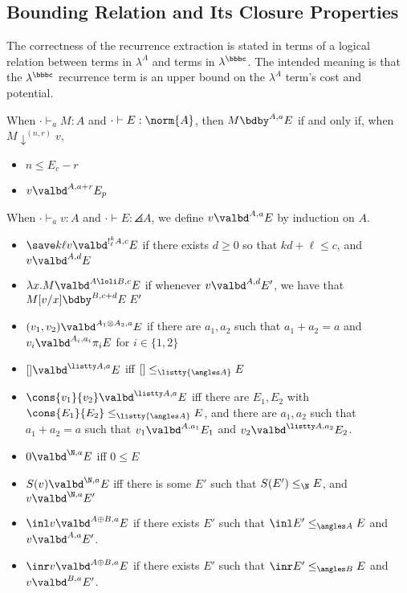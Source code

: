 \subsection{Bounding Relation and Its Closure Properties}

The correctness of the recurrence extraction is stated in terms of a
logical relation between terms in $\lambda^A$ and terms in
$\lambda^\bbbc$. The intended meaning is that the $\lambda^\bbbc$
recurrence term is an upper bound on the $\lambda^A$ term's cost and
potential.

\begin{definition} \label{def:bounding}
When $\cdot \vdash_a M : A$ and $\cdot \vdash E : \norm{A}$, then $M \bdby^{A,a} E$ if and only if, when $M \downarrow^{(n,r)} v$,
\begin{itemize}
  \item $n \leq E_c - r$
  \item $v \valbd^{A,a+r} E_p$
\end{itemize}
When $\cdot \vdash_a v : A$ and $\cdot \vdash E : \angles A$, we define $v
\valbd^{A,a} E$ by induction on $A$.
\begin{itemize}
    \item $\save k \ell v \valbd^{!^k_\ell A,c} E$ if there exists $d \geq 0$ so that $kd + \ell \leq c$, and $v \valbd^{A,d} E$
    \item $\lambda x.M \valbd^{A \loli B, c} E$ if whenever $v \valbd^{A,d} E'$, we have that $M[v/x] \bdby^{B,c+d} E \; E'$
    \item $(v_1,v_2) \valbd^{A_1 \otimes A_2,a} E$ if there are $a_1,a_2$ such that $a_1+a_2 = a$ and $v_i \valbd^{A_i,a_i} \pi_i E$ for $i \in \{1,2\}$
    \item $[] \valbd^{\listty A,a} E$ iff $[] \leq_{\listty {\angles A}} E$
    \item $\cons {v_1} {v_2} \valbd^{\listty A,a} E$ iff there are $E_1,E_2$ with $\cons {E_1} {E_2} \leq_{\listty {\angles A}} E$, and there are $a_1,a_2$ such that $a_1 + a_2 = a$ such that $v_1 \valbd^{A,a_1} E_1$ and $v_2 \valbd^{\listty A, a_2} E_2$.
    \item $0 \valbd^{\N,a} E$ iff $0 \leq E$
    \item $S(v) \valbd^{\N,a} E$ iff there is some $E'$ such that $S(E') \leq_\N E$, and $v \valbd^{\N,a} E'$
    \item $\inl v \valbd^{A \oplus B,a} E$ if there exists $E'$ such that $\inl E' \leq_{\angles A} E$ and $v \valbd^{A,a} E'$.
    \item $\inr v \valbd^{A \oplus B,a} E$ if there exists $E'$ such that $\inr E' \leq_{\angles B} E$ and $v \valbd^{B,a} E'$.

\end{itemize}
\end{definition}
